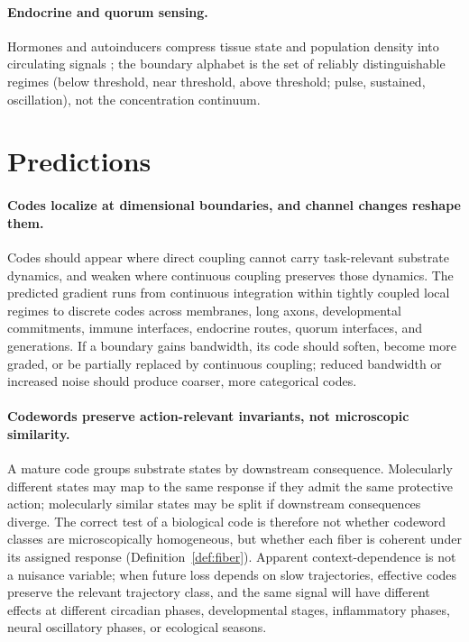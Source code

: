 \documentclass[12pt]{article}
\theoremstyle{definition}
\begin{document}
\paragraph{Endocrine and quorum sensing.} Hormones and autoinducers compress tissue state and population density into circulating signals \citep{miller2001,bassler2002}; the boundary alphabet is the set of reliably distinguishable regimes (below threshold, near threshold, above threshold; pulse, sustained, oscillation), not the concentration continuum.

\section{Predictions}
\label{sec:predictions}

\paragraph{Codes localize at dimensional boundaries, and channel changes reshape them.} Codes should appear where direct coupling cannot carry task-relevant substrate dynamics, and weaken where continuous coupling preserves those dynamics. The predicted gradient runs from continuous integration within tightly coupled local regimes to discrete codes across membranes, long axons, developmental commitments, immune interfaces, endocrine routes, quorum interfaces, and generations. If a boundary gains bandwidth, its code should soften, become more graded, or be partially replaced by continuous coupling; reduced bandwidth or increased noise should produce coarser, more categorical codes.

\paragraph{Codewords preserve action-relevant invariants, not microscopic similarity.} A mature code groups substrate states by downstream consequence. Molecularly different states may map to the same response if they admit the same protective action; molecularly similar states may be split if downstream consequences diverge. The correct test of a biological code is therefore not whether codeword classes are microscopically homogeneous, but whether each fiber is coherent under its assigned response (Definition~\ref{def:fiber}). Apparent context-dependence is not a nuisance variable; when future loss depends on slow trajectories, effective codes preserve the relevant trajectory class, and the same signal will have different effects at different circadian phases, developmental stages, inflammatory phases, neural oscillatory phases, or ecological seasons.
\end{document}

